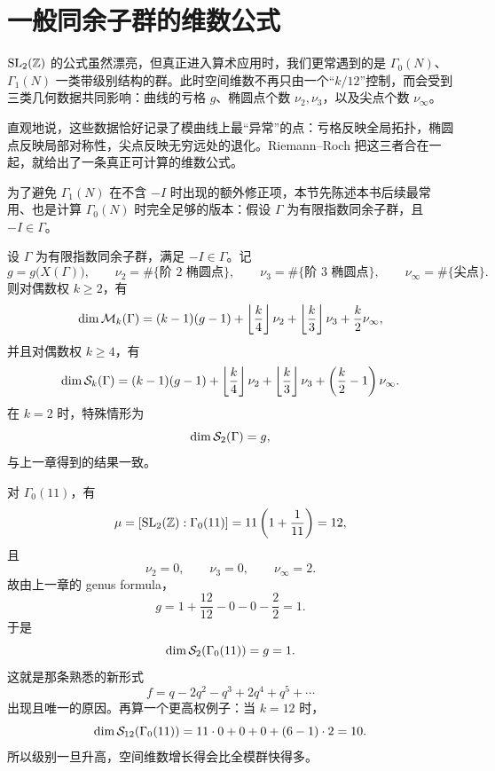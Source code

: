 \section{一般同余子群的维数公式}
\label{sec:dim-general}

$\mathrm{SL}_2(\mathbb{Z})$ 的公式虽然漂亮，但真正进入算术应用时，我们更常遇到的是 $\Gamma_0(N)$、$\Gamma_1(N)$ 一类带级别结构的群。此时空间维数不再只由一个“$k/12$”控制，而会受到三类几何数据共同影响：曲线的亏格 $g$、椭圆点个数 $\nu_2,\nu_3$，以及尖点个数 $\nu_\infty$。

直观地说，这些数据恰好记录了模曲线上最“异常”的点：亏格反映全局拓扑，椭圆点反映局部对称性，尖点反映无穷远处的退化。Riemann--Roch 把这三者合在一起，就给出了一条真正可计算的维数公式。



为了避免 $\Gamma_1(N)$ 在不含 $-I$ 时出现的额外修正项，本节先陈述本书后续最常用、也是计算 $\Gamma_0(N)$ 时完全足够的版本：假设 $\Gamma$ 为有限指数同余子群，且 $-I\in \Gamma$。

\begin{theorem}[一般维数公式]
\label{thm:dim-general}
设 $\Gamma$ 为有限指数同余子群，满足 $-I\in\Gamma$。记
\[
  g=g\bigl(X(\Gamma)\bigr),\qquad \nu_2=\#\{\text{阶 }2\text{ 椭圆点}\},
  \qquad \nu_3=\#\{\text{阶 }3\text{ 椭圆点}\},
  \qquad \nu_\infty=\#\{\text{尖点}\}.
\]
则对偶数权 $k\ge 2$，有
\[
  \dim \mathcal{M}_k(\Gamma)
  =(k-1)(g-1)+\left\lfloor\frac{k}{4}\right\rfloor\nu_2
   +\left\lfloor\frac{k}{3}\right\rfloor\nu_3
   +\frac{k}{2}\nu_\infty,
\]
并且对偶数权 $k\ge 4$，有
\[
  \dim \mathcal{S}_k(\Gamma)
  =(k-1)(g-1)+\left\lfloor\frac{k}{4}\right\rfloor\nu_2
   +\left\lfloor\frac{k}{3}\right\rfloor\nu_3
   +\left(\frac{k}{2}-1\right)\nu_\infty.
\]
在 $k=2$ 时，特殊情形为
\[
  \dim \mathcal{S}_2(\Gamma)=g,
\]
与上一章得到的结果一致。
\end{theorem}

\begin{example}
\label{ex:dim-gamma0-11}
对 $\Gamma_0(11)$，有
\[
  \mu=[\mathrm{SL}_2(\mathbb{Z}):\Gamma_0(11)]=11\left(1+\frac1{11}\right)=12,
\]
且
\[
  \nu_2=0,\qquad \nu_3=0,\qquad \nu_\infty=2.
\]
故由上一章的 genus formula，
\[
  g=1+\frac{12}{12}-0-0-\frac22=1.
\]
于是
\[
  \dim \mathcal{S}_2(\Gamma_0(11))=g=1.
\]
这就是那条熟悉的新形式
\[
  f=q-2q^2-q^3+2q^4+q^5+\cdots
\]
出现且唯一的原因。再算一个更高权例子：当 $k=12$ 时，
\[
  \dim \mathcal{S}_{12}(\Gamma_0(11))
  =11\cdot 0+0+0+\left(6-1\right)\cdot 2=10.
\]
所以级别一旦升高，空间维数增长得会比全模群快得多。
\end{example}

